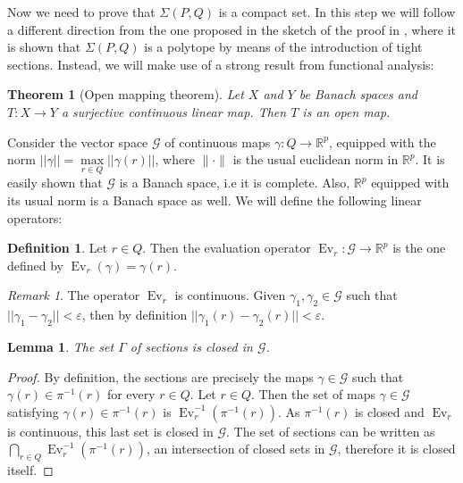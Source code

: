 \documentclass[10pt,a4paper]{article}
\DeclareMathOperator{\Ev}{Ev}
\newcommand{\RR}{\mathbb{R}}
\newcommand{\eps}{\varepsilon}
\theoremstyle{plain}
\newtheorem{theorem}{Theorem}
\newtheorem{lemma}{Lemma}
\theoremstyle{remark}
\newtheorem{remark}{Remark}
\theoremstyle{definition}
\newtheorem{definition}{Definition}
\begin{document}
Now we need to prove that $\Sigma(P,Q)$ is a compact set. 
In this step we will follow a different direction from the one
proposed in the sketch of the proof in \cite[Thm 9.6]{ziegler2012lectures}, 
where it is shown that $\Sigma(P,Q)$ is a polytope by means of the
introduction of tight sections. 
Instead, we will make use of a strong result from functional analysis:

\begin{theorem}[Open mapping theorem] 
	\label{thm:openmap}
	Let $X$ and $Y$ be Banach spaces and $T:X\rightarrow Y$ 
	a surjective continuous linear map. 
	Then $T$ is an open map. 
\end{theorem}

Consider the vector space $\mathcal{G}$ of continuous maps 
$\gamma: Q\rightarrow \RR^p$, 
equipped with the norm 
$||\gamma||=\max\limits_{r\in Q} ||\gamma(r)||$,
where $\|\cdot\|$ is the usual euclidean norm in $\RR^p$.
It is easily shown that $\mathcal{G}$ is a Banach space, i.e it is complete. 
Also, $\RR^p$ equipped with its usual norm is a Banach space as well. 
We will define the following linear operators:

\begin{definition} 
	Let $r\in Q$. 
	Then the evaluation operator 
	$\Ev_r: \mathcal{G}\rightarrow \RR^p$ 
	is the one defined by $\Ev_r(\gamma)=\gamma(r)$.
\end{definition}

\begin{remark} 
	The operator $\Ev_r$ is continuous. 
	Given $\gamma_1,\gamma_2\in \mathcal{G}$ such that $||\gamma_1-\gamma_2||< \eps$,
	then by definition 
	$||\gamma_1(r)-\gamma_2(r)||< \eps$.
\end{remark}

\begin{lemma} 
	The set $\Gamma$ of sections is closed in $\mathcal{G}$.
\end{lemma}
\begin{proof}
	By definition, the sections are precisely the maps $\gamma \in \mathcal{G}$
	such that $\gamma(r)\in \pi^{-1}(r)$ for every $r\in Q$.
	Let $r\in Q$. Then the set of maps $\gamma \in \mathcal{G}$ satisfying 
	$\gamma(r)\in \pi^{-1}(r)$ is $\Ev_r^{-1}( \pi^{-1}(r))$. 
	As $\pi^{-1}(r)$ is closed and $\Ev_r$ is continuous, 
	this last set is closed in $\mathcal{G}$. 
	The set of sections can be written as 
	$\bigcap_{r\in Q}\Ev_r^{-1}( \pi^{-1}(r))$, an intersection 
	of closed sets in $\mathcal{G}$,
	therefore it is closed itself. 
\end{proof}
\end{document}
